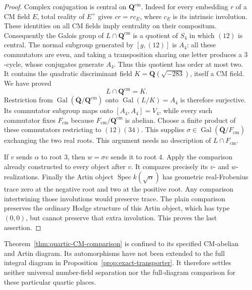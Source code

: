 \documentclass[11pt]{article}
\theoremstyle{definition}\newtheorem{definition}[theorem]{Definition}
\theoremstyle{remark}\newtheorem{remark}[theorem]{Remark}
\newcommand{\Q}{\mathbf Q}\newcommand{\Z}{\mathbf Z}
\newcommand{\Qb}{\overline{\mathbf Q}}\newcommand{\Fp}{\mathbf F_p}
\DeclareMathOperator{\Gal}{Gal}\DeclareMathOperator{\im}{im}
\begin{document}
\begin{proof}
Complex conjugation is central on $\Q^{\mathrm{cm}}$. Indeed for every
embedding $r$ of a CM field $E$, total reality of $E^+$ gives
$c r=r c_E$, where $c_E$ is its intrinsic involution. These identities
on all CM fields imply centrality on their compositum. Consequently
the Galois group of $L\cap\Q^{\mathrm{cm}}$ is a quotient of $S_4$ in
which $(12)$ is central. The normal subgroup generated by
$[g,(12)]$ is $A_4$: all these commutators are even, and taking a
transposition sharing one letter produces a $3$-cycle, whose conjugates
generate $A_4$. Thus this quotient has order at most two. It contains
the quadratic discriminant field $K=\Q(\sqrt{-283})$, itself a CM field.
We have proved
\[
              L\cap\Q^{\mathrm{cm}}=K.
\]
Restriction from $\Gal(\Qb/\Q^{\mathrm{cm}})$ onto $\Gal(L/K)=A_4$
is therefore surjective. Its commutator subgroup maps onto
$[A_4,A_4]=V_4$, while every such commutator fixes $F_{\mathrm{cm}}$
because $F_{\mathrm{cm}}/\Q^{\mathrm{cm}}$ is abelian. Choose a finite
product of these commutators restricting to $(12)(34)$. This supplies
$\sigma\in\Gal(\Qb/F_{\mathrm{cm}})$ exchanging the two real roots.
This argument needs no description of $L\cap F_{\mathrm{cm}}$.

If $v$ sends $\alpha$ to root $3$, then $w=\sigma v$ sends it to root
$4$. Apply the comparison already constructed to every object after
$v$. It compares precisely its $v$- and $w$-realizations. Finally the
Artin object $\operatorname{Spec}k(\sqrt\alpha)$ has geometric
real-Frobenius trace zero at the negative root and two at the positive
root. Any comparison intertwining those involutions would preserve
trace. The plain comparison preserves the ordinary Hodge structure
of this Artin object, which has type $(0,0)$, but cannot preserve that
extra involution. This proves the last assertion.
\end{proof}

Theorem~\ref{thm:quartic-CM-comparison} is confined to its specified
CM-abelian and Artin diagram. Its automorphisms have not been extended
to the full integral diagram in Proposition~\ref{prop:exact-transporter}.
It therefore settles neither universal number-field separation nor
the full-diagram comparison for these particular quartic places.
\end{document}

